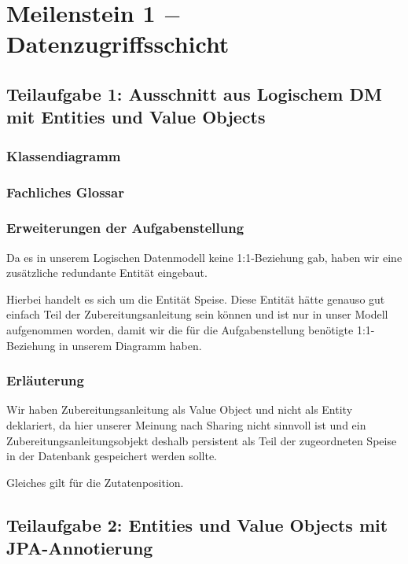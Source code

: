 \section{Meilenstein 1 $-$ Datenzugriffsschicht}

\subsection{Teilaufgabe 1: Ausschnitt aus Logischem DM mit Entities und Value Objects}
\label{ldm}

\subsubsection{Klassendiagramm}


\subsubsection{Fachliches Glossar}


\subsubsection{Erweiterungen der Aufgabenstellung}

Da es in unserem Logischen Datenmodell keine 1:1-Beziehung gab,
haben wir eine zus\"atzliche redundante Entit\"at eingebaut.

Hierbei handelt es sich um die Entit\"at Speise. Diese Entit\"at
h\"atte genauso gut einfach Teil der Zubereitungsanleitung sein
k\"onnen und ist nur in unser Modell aufgenommen worden, damit
wir die f\"ur die Aufgabenstellung ben\"otigte 1:1-Beziehung in
unserem Diagramm haben.

\subsubsection{Erl\"auterung}

Wir haben Zubereitungsanleitung als Value Object und nicht als
Entity deklariert, da hier unserer Meinung nach Sharing nicht
sinnvoll ist und ein Zubereitungsanleitungsobjekt deshalb
persistent als Teil der zugeordneten Speise in der Datenbank
gespeichert werden sollte.

Gleiches gilt f\"ur die Zutatenposition.


\newpage

\subsection{Teilaufgabe 2: Entities und Value Objects mit JPA-Annotierung}

